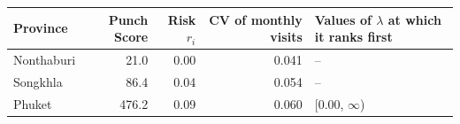 \begin{tabular}{lrrrl}
\toprule
Province & Punch Score & Risk $r_i$ & CV of monthly visits & Values of $\lambda$ at which it ranks first \\
\midrule
Nonthaburi & 21.0 & 0.00 & 0.041 & -- \\
Songkhla & 86.4 & 0.04 & 0.054 & -- \\
Phuket & 476.2 & 0.09 & 0.060 & [0.00, $\infty$) \\
\bottomrule
\end{tabular}
